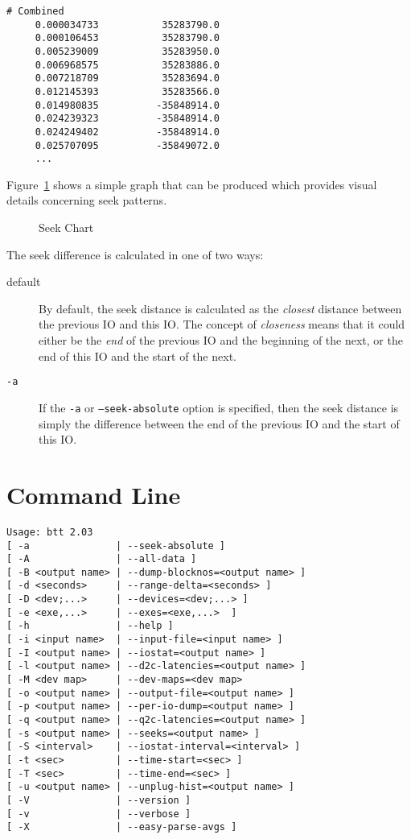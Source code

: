 \documentclass{article}
\begin{document}
\begin{verbatim}
# Combined
     0.000034733           35283790.0
     0.000106453           35283790.0
     0.005239009           35283950.0
     0.006968575           35283886.0
     0.007218709           35283694.0
     0.012145393           35283566.0
     0.014980835          -35848914.0
     0.024239323          -35848914.0
     0.024249402          -35848914.0
     0.025707095          -35849072.0
     ...
\end{verbatim}

  Figure~\ref{fig:seek} shows a simple graph that can be produced which
  provides visual details concerning seek patterns.

  \begin{figure}[h!]
  \leavevmode\centering
  \caption{\label{fig:seek}Seek Chart}
  \end{figure}
  \FloatBarrier

  The seek difference is calculated in one of two ways:

  \begin{description}
    \item[default] By default, the seek distance is calculated as the
    \emph{closest} distance between the previous IO and this IO. The
    concept of \emph{closeness} means that it could either be the
    \emph{end} of the previous IO and the beginning of the next, or the
    end of this IO and the start of the next.

    \item[\texttt{-a}] If the \texttt{-a} or \texttt{--seek-absolute}
    option is specified, then the seek distance is simply the difference
    between the end of the previous IO and the start of this IO.
  \end{description}

\newpage\section{\label{sec:cmd-line}Command Line}

\begin{verbatim}
Usage: btt 2.03
[ -a               | --seek-absolute ]
[ -A               | --all-data ]
[ -B <output name> | --dump-blocknos=<output name> ]
[ -d <seconds>     | --range-delta=<seconds> ]
[ -D <dev;...>     | --devices=<dev;...> ]
[ -e <exe,...>     | --exes=<exe,...>  ]
[ -h               | --help ]
[ -i <input name>  | --input-file=<input name> ]
[ -I <output name> | --iostat=<output name> ]
[ -l <output name> | --d2c-latencies=<output name> ]
[ -M <dev map>     | --dev-maps=<dev map>
[ -o <output name> | --output-file=<output name> ]
[ -p <output name> | --per-io-dump=<output name> ]
[ -q <output name> | --q2c-latencies=<output name> ]
[ -s <output name> | --seeks=<output name> ]
[ -S <interval>    | --iostat-interval=<interval> ]
[ -t <sec>         | --time-start=<sec> ]
[ -T <sec>         | --time-end=<sec> ]
[ -u <output name> | --unplug-hist=<output name> ]
[ -V               | --version ]
[ -v               | --verbose ]
[ -X               | --easy-parse-avgs ]
\end{verbatim}
\end{document}

